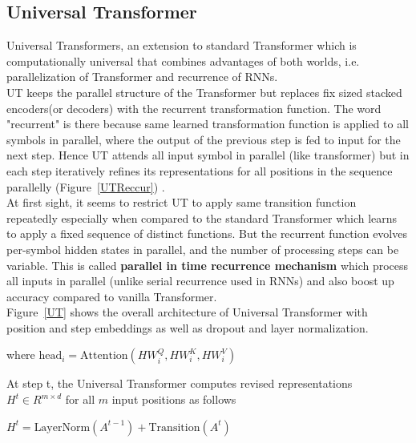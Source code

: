 \documentclass{article}
\begin{document}
\begin{multicols}{2}
    \section{Universal Transformer}
     Universal Transformers, an extension to standard Transformer which is computationally universal that combines advantages of both worlds, i.e. parallelization of Transformer and recurrence of RNNs.
     \\
     UT keeps the parallel structure of the Transformer but replaces fix sized stacked encoders(or decoders) with the recurrent transformation function. The word "recurrent" is there because same learned transformation function is applied to all symbols in parallel, where the output of the previous step is fed to input for the next step. Hence UT attends all input symbol in parallel (like transformer) but in each step iteratively refines its representations for all positions in the sequence parallelly (Figure~\ref{UTReccur}) .\\
     At first sight, it seems to restrict UT to apply same transition function repeatedly especially when compared to the standard Transformer which learns to apply a fixed sequence of distinct functions. But the recurrent function evolves per-symbol hidden states in parallel, and the number of processing steps can be variable. This is called \textbf{parallel in time recurrence mechanism} which process all inputs in parallel (unlike serial recurrence used in RNNs) and also boost up accuracy compared to vanilla Transformer. \\
     
  \noindent   Figure~\ref{UT} shows the overall architecture of Universal Transformer with position and step embeddings as well as dropout and layer normalization.

\begin{center}
\noindent {}

where $\text{head}_i = \text{Attention} (HW^Q_i,HW^K_i, HW^V_i)$
\end{center}

At step t, the Universal Transformer computes revised representations $H^t \in  R^{m\times d}$ for all $m$ input positions as follows

\begin{center}
$H^t  = \text{LayerNorm}(A^{t-1})+\text{Transition}(A^t)$
 \noindent {}
\end{center}


\end{multicols}
\end{document}
